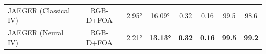 \begin{table}[t]
\begin{tabular}{l c cccc cc}
    \midrule
    
    JAEGER (Classical IV)     & RGB-D+FOA     & \ang{2.95} & \ang{16.09} & 0.32 & 0.16 & 99.5 & 98.6 \\
    JAEGER (Neural IV)      & RGB-D+FOA     & \ang{2.21} & \textbf{\ang{13.13}} & \textbf{0.32} & \textbf{0.16} & \textbf{99.5} & \textbf{99.2} \\
    
    \bottomrule
    \end{tabular}
    \label{tab:main}
\end{table}
